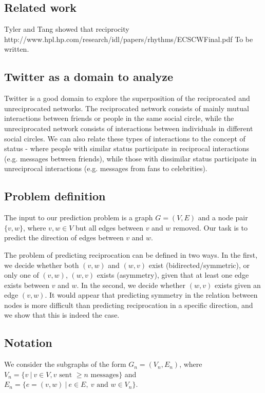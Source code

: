 \documentclass[conference]{IEEEtran}
\begin{document}
\subsection{Related work}
Tyler and Tang showed that reciprocity 
http://www.hpl.hp.com/research/idl/papers/rhythms/ECSCWFinal.pdf
To be written.

\subsection{Twitter as a domain to analyze}
Twitter is a good domain to explore the superposition of the reciprocated and unreciprocated networks. The reciprocated network consists of mainly mutual interactions between friends or people in the same social circle, while the unreciprocated network consists of interactions between individuals in different social circles. We can also relate these types of interactions to the concept of status - where people with similar status participate in reciprocal interactions (e.g. messages between friends), while those with dissimilar status participate in unreciprocal interactions (e.g. messages from fans to celebrities).

\subsection{Problem definition}
The input to our prediction problem is a graph $G=(V,E)$ and a node pair $\{v,w\}$, where $v,w \in V$ but all edges between $v$ and $w$ removed. Our task is to predict the direction of edges between $v$ and $w$.

The problem of predicting reciprocation can be defined in two ways. In the first, we decide whether both $(v,w)$ and $(w,v)$ exist (bidirected/symmetric), or only one of $(v,w)$, $(w,v)$ exists (asymmetry), given that at least one edge exists between $v$ and $w$. In the second, we decide whether $(w,v)$ exists given an edge $(v,w)$. It would appear that predicting symmetry in the relation between nodes is more difficult than predicting reciprocation in a specific direction, and we show that this is indeed the case.

\subsection{Notation}

We consider the subgraphs of the form $G_n = (V_n, E_n)$, where $V_n = \{v~|~v \in V, v \text{ sent } \ge n \text{ messages}\}$ and $E_n = \{e=(v,w)~|~e \in E,~v \text{ and } w \in V_n\}$.
\end{document}

